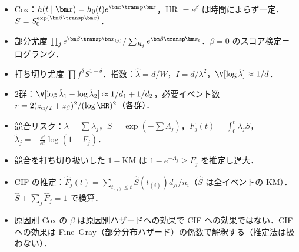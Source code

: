 \begin{summarybox}
\begin{itemize}
\item Cox：$h(t\mid\bm x)=h_0(t)e^{\bm\beta\transp\bm x}$，HR $=e^\beta$ は時間によらず一定．$S=S_0^{\exp(\bm\beta\transp\bm x)}$．
\item 部分尤度 $\prod_j e^{\bm\beta\transp\bm x_{(j)}}/\sum_{R_j}e^{\bm\beta\transp\bm x_l}$．$\beta=0$ のスコア検定＝ログランク．
\item 打ち切り尤度 $\prod f^{\delta}S^{1-\delta}$．指数：$\hat\lambda=d/W$，$I=d/\lambda^2$，$\V[\log\hat\lambda]\approx1/d$．
\item 2群：$\V[\log\hat\lambda_1-\log\hat\lambda_2]\approx1/d_1+1/d_2$，必要イベント数 $r=2(z_{\alpha/2}+z_\beta)^2/(\log\HR)^2$（各群）．
\item 競合リスク：$\lambda=\sum\lambda_j$，$S=\exp(-\sum\Lambda_j)$，$F_j(t)=\int_0^t\lambda_jS$，$\tilde\lambda_j=-\frac{\dd}{\dd t}\log(1-F_j)$．
\item 競合を打ち切り扱いした $1-\mathrm{KM}$ は $1-e^{-\Lambda_j}\ge F_j$ を推定し過大．
\item CIF の推定：$\hat F_j(t)=\sum_{t_{(i)}\le t}\hat S(t_{(i)}^-)d_{ji}/n_i$（$\hat S$ は全イベントの KM）．$\hat S+\sum_j\hat F_j=1$ で検算．
\item 原因別 Cox の $\beta$ は原因別ハザードへの効果で CIF への効果ではない．CIF への効果は Fine--Gray（部分分布ハザード）の係数で解釈する（推定法は扱わない）．
\end{itemize}
\end{summarybox}
